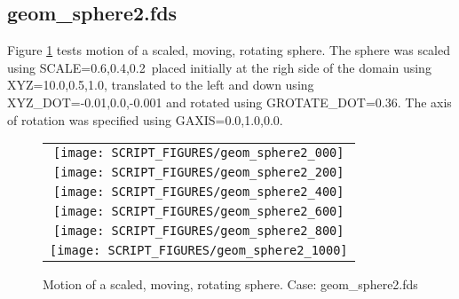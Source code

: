 \documentclass[12pt]{article}
\begin{document}
\subsection{geom\_sphere2.fds}
Figure \ref{fig:geom_sphere2b} tests motion of a scaled,  moving, rotating sphere. The sphere was scaled using {\ct SCALE=0.6,0.4,0.2}\, placed initially at the righ side of the domain using {\ct XYZ=10.0,0.5,1.0}, translated to the left and down using {\ct XYZ\_DOT=-0.01,0.0,-0.001} and rotated using {\ct GROTATE\_DOT=0.36}.  The axis of rotation was specified using {\ct GAXIS=0.0,1.0,0.0}.

\begin{figure}
\begin{center}
\begin{tabular}{c}
\texttt{[image: SCRIPT\_FIGURES/geom\_sphere2\_000]}\\
\texttt{[image: SCRIPT\_FIGURES/geom\_sphere2\_200]}\\
\texttt{[image: SCRIPT\_FIGURES/geom\_sphere2\_400]}\\
\texttt{[image: SCRIPT\_FIGURES/geom\_sphere2\_600]}\\
\texttt{[image: SCRIPT\_FIGURES/geom\_sphere2\_800]}\\
\texttt{[image: SCRIPT\_FIGURES/geom\_sphere2\_1000]}
  \end{tabular}
\end{center}
 \caption{Motion of a scaled, moving, rotating sphere.  Case: geom\_sphere2.fds}
\label{fig:geom_sphere2b}
\end{figure}


\end{document}
